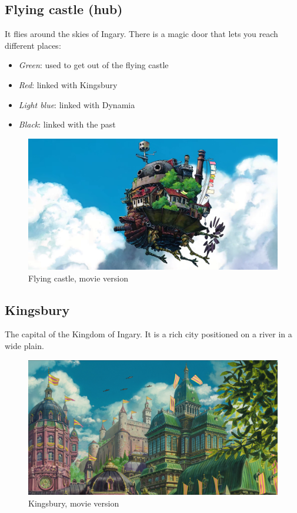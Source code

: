 \subsection{Flying castle (hub)}
It flies around the skies of Ingary. There is a magic door that lets you reach different places:
\begin{itemize}
	\item \textit{Green}: used to get out of the flying castle
	\item \textit{Red}: linked with Kingsbury
	\item \textit{Light blue}: linked with Dynamia
	\item \textit{Black}: linked with the past
\end{itemize}
\begin{figure}[H]
  \centering
  \includegraphics[width=12cm]{../Images/Locations/flyingCastle}
  \caption{Flying castle, movie version}
\end{figure}

\subsection{Kingsbury}
The capital of the Kingdom of Ingary. It is a rich city positioned on a river in a wide plain.
\begin{figure}[H]
  \centering
  \includegraphics[width=12cm]{../Images/Locations/kingsbury}
  \caption{Kingsbury, movie version}
\end{figure}

